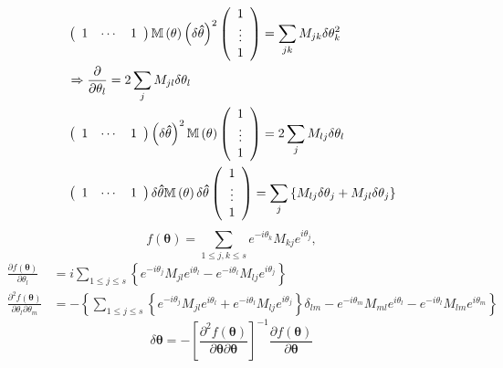\documentclass[aps,preprint]{revtex4}%
\begin{document}
\begin{align}
& \left(
\begin{array}
[c]{ccc}%
1 & \cdots & 1
\end{array}
\right)  \mathbb{M}\left(  \mathbf{\theta}\right)  \left(  \delta
\mathbf{\hat{\theta}}\right)  ^{2}\left(
\begin{array}
[c]{c}%
1\\
\vdots\\
1
\end{array}
\right)  =\sum_{jk}M_{jk}\delta\theta_{k}^{2}\\
& \Rightarrow\frac{\partial}{\partial\theta_{l}}=2\sum_{j}M_{jl}\delta
\theta_{l}\\
& \left(
\begin{array}
[c]{ccc}%
1 & \cdots & 1
\end{array}
\right)  \left(  \delta\mathbf{\hat{\theta}}\right)  ^{2}\mathbb{M}\left(
\mathbf{\theta}\right)  \left(
\begin{array}
[c]{c}%
1\\
\vdots\\
1
\end{array}
\right)  =2\sum_{j}M_{lj}\delta\theta_{l}\\
& \left(
\begin{array}
[c]{ccc}%
1 & \cdots & 1
\end{array}
\right)  \delta\mathbf{\hat{\theta}}\mathbb{M}\left(  \mathbf{\theta}\right)
\delta\mathbf{\hat{\theta}}\left(
\begin{array}
[c]{c}%
1\\
\vdots\\
1
\end{array}
\right)  =\sum_{j}\left\{  M_{lj}\delta\theta_{j}+M_{jl}\delta\theta
_{j}\right\}
\end{align}%
\begin{equation}
f\left(  \mathbf{\theta}\right)  =\sum_{1\leq j,k\leq s}e^{-i\theta_{k}}%
M_{kj}e^{i\theta_{j}},
\end{equation}%
\begin{align}
\frac{\partial f\left(  \mathbf{\theta}\right)  }{\partial\theta_{l}}  &
=i\sum_{1\leq j\leq s}\left\{  e^{-i\theta_{j}}M_{jl}e^{i\theta_{l}%
}-e^{-i\theta_{l}}M_{lj}e^{i\theta_{j}}\right\}  \\
\frac{\partial^{2}f\left(  \mathbf{\theta}\right)  }{\partial\theta
_{l}\partial\theta_{m}}  & =-\left\{  \sum_{1\leq j\leq s}\left\{
e^{-i\theta_{j}}M_{jl}e^{i\theta_{l}}+e^{-i\theta_{l}}M_{lj}e^{i\theta_{j}%
}\right\}  \delta_{lm}-e^{-i\theta_{m}}M_{ml}e^{i\theta_{l}}-e^{-i\theta_{l}%
}M_{lm}e^{i\theta_{m}}\right\}
\end{align}%
\begin{equation}
\delta\mathbf{\theta=-}\left[  \frac{\partial^{2}f\left(  \mathbf{\theta
}\right)  }{\partial\mathbf{\theta}\partial\mathbf{\theta}}\right]  ^{-1}%
\frac{\partial f\left(  \mathbf{\theta}\right)  }{\partial\mathbf{\theta}}%
\end{equation}
\end{document}
